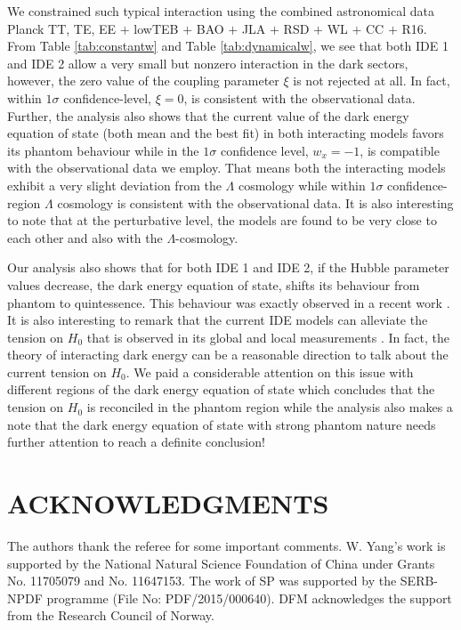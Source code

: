 \documentclass[superscriptaddress,oneolumn,secnumarabic,
amssymb,amsmath,nobibnotes,aps,prd,showpacs,nofootinbib]{revtex4}%
\begin{document}
We constrained such typical interaction using the combined astronomical data  Planck TT, TE, EE $+$ lowTEB $+$ BAO $+$ JLA $+$ RSD $+$ WL $+$ CC $+$ R16. From Table \ref{tab:constantw} and Table \ref{tab:dynamicalw}, we see that both IDE 1 and IDE 2 allow a very small but nonzero interaction in the dark sectors, however, the zero value of the coupling parameter $\xi$ is not rejected at all. In fact, within $1\sigma$ confidence-level, $\xi = 0$, is consistent with the observational data. Further, the analysis also shows that the current value of the dark energy equation of state (both mean and the best fit) in both interacting models favors its phantom behaviour while in the $1\sigma$ confidence level, $w_x = -1$, is compatible with the observational data we employ. That means both
the interacting models exhibit a very slight deviation from
the $\Lambda$ cosmology while within $1\sigma$ confidence-region $\Lambda$
cosmology is consistent with the observational data. It is also interesting to note that at the perturbative level, the models are found to be very close to each other and also with the $\Lambda$-cosmology.

Our analysis also shows that for both IDE 1 and IDE 2, if the Hubble parameter values decrease, the dark energy equation of state, shifts its behaviour from phantom to quintessence. This behaviour was exactly observed in a recent work \cite{ypb}.  It is also interesting to remark that
the current IDE models can alleviate the tension
on $H_0$ that is observed in its global \cite{Ade:2015xua} and local
measurements \cite{Riess:2016jrr}. In fact, the theory of interacting dark energy
can be a reasonable direction to talk about the current tension on
$H_0$. We paid a considerable attention
on this issue with different regions of the dark energy equation of state
which concludes that the tension
on $H_0$ is reconciled in the phantom region while
the analysis also makes a note that the dark energy equation of
state with strong phantom nature needs further attention
to reach a definite conclusion!












\section*{ACKNOWLEDGMENTS}
The authors thank the referee for some important comments. W. Yang's work is supported by the National Natural Science Foundation of China under Grants No. 11705079 and No. 11647153. The work of SP was supported by the SERB-NPDF programme (File No: PDF/2015/000640). DFM acknowledges the support from the Research Council of Norway.
\end{document}
